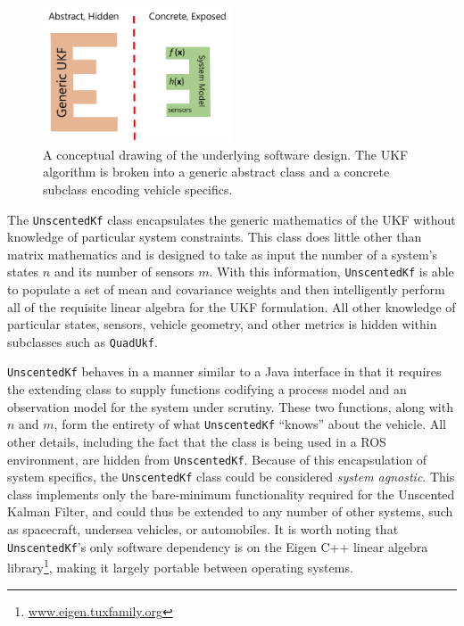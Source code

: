 \begin{figure}
        \centering
        \includegraphics[width=0.5\textwidth]{generic_ukf}
        \caption[UKF Software Design]{A conceptual drawing of the underlying software design. The UKF algorithm is broken into a generic abstract class and a concrete subclass encoding vehicle specifics.}
        \label{fig:generic_ukf}
\end{figure}

The \texttt{UnscentedKf} class encapsulates the generic mathematics of the UKF without knowledge of particular system constraints. This class does little other than matrix mathematics and is designed to take as input the number of a system's states $n$ and its number of sensors $m$. With this information, \texttt{UnscentedKf} is able to populate a set of mean and covariance weights and then intelligently perform all of the requisite linear algebra for the UKF formulation. All other knowledge of particular states, sensors, vehicle geometry, and other metrics is hidden within subclasses such as \texttt{QuadUkf}.

\texttt{UnscentedKf} behaves in a manner similar to a Java interface in that it requires the extending class to supply functions codifying a process model and an observation model for the system under scrutiny. These two functions, along with $n$ and $m$, form the entirety of what \texttt{UnscentedKf} ``knows'' about the vehicle. All other details, including the fact that the class is being used in a ROS environment, are hidden from \texttt{UnscentedKf}. Because of this encapsulation of system specifics, the \texttt{UnscentedKf} class could be considered \textit{system agnostic}. This class implements only the bare-minimum functionality required for the Unscented Kalman Filter, and could thus be extended to any number of other systems, such as spacecraft, undersea vehicles, or automobiles. It is worth noting that \texttt{UnscentedKf}'s only software dependency is on the Eigen C++ linear algebra library\footnote{\url{www.eigen.tuxfamily.org}}, making it largely portable between operating systems.

